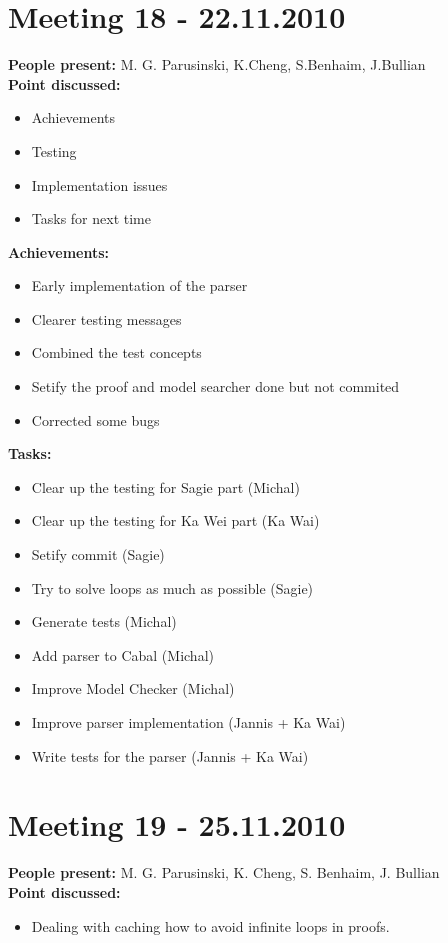 \documentclass[12pt]{article}
\begin{document}
\section*{Meeting 18 - 22.11.2010}
\textbf{People present:} M. G. Parusinski, K.Cheng, S.Benhaim, J.Bullian \\
\textbf{Point discussed:}
\begin{itemize}
\item Achievements
\item Testing
\item Implementation issues
\item Tasks for next time
\end{itemize}
\textbf{Achievements:}
\begin{itemize}
\item Early implementation of the parser
\item Clearer testing messages
\item Combined the test concepts
\item Setify the proof and model searcher done but not commited
\item Corrected some bugs
\end{itemize}
\textbf{Tasks:}
\begin{itemize}
\item Clear up the testing for Sagie part (Michal)
\item Clear up the testing for Ka Wei part (Ka Wai)
\item Setify commit (Sagie)
\item Try to solve loops as much as possible (Sagie)
\item Generate tests (Michal)
\item Add parser to Cabal (Michal)
\item Improve Model Checker (Michal)
\item Improve parser implementation (Jannis + Ka Wai)
\item Write tests for the parser (Jannis + Ka Wai)
\end{itemize}

\section*{Meeting 19 - 25.11.2010}
\textbf{People present:} M. G. Parusinski, K. Cheng, S. Benhaim, J. Bullian \\
\textbf{Point discussed:}
\begin{itemize}
\item Dealing with caching how to avoid infinite loops in proofs.
\end{itemize}
\end{document}
